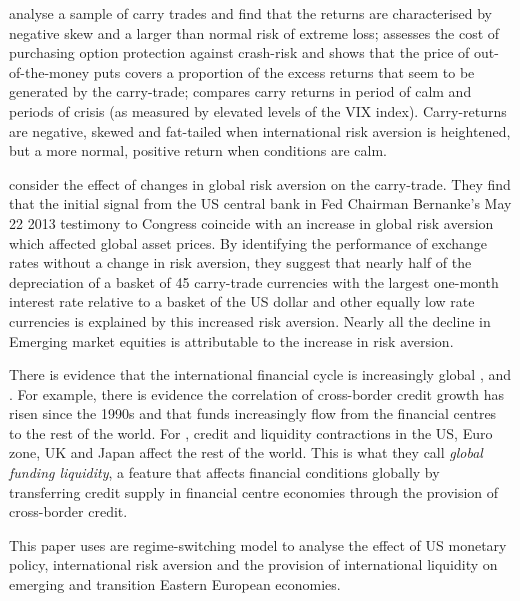 \documentclass[12pt, a4paper, oneside]{article} %
\begin{document}
\citet{BrunnermeierCarry} analyse a sample of carry trades and find that the returns are characterised by negative skew and a larger than normal risk of extreme loss; \citet{JurekCrash} assesses the cost of purchasing option protection against crash-risk and shows that the price of out-of-the-money puts covers a proportion of the excess returns that seem to be generated by the carry-trade; \citet{Hayward2013} compares carry returns in period of calm and periods of crisis (as measured by elevated levels of the VIX index).  Carry-returns are negative, skewed and fat-tailed when international risk aversion is heightened, but a more normal, positive return when conditions are calm. 

 
\citet{NYFedtaper} consider the effect of changes in global risk aversion on the carry-trade.  They find that the initial signal from the US central bank in Fed Chairman Bernanke's May 22 2013 testimony to Congress coincide with an increase in global risk aversion which affected global asset prices. %
By identifying the performance of exchange rates without a change in risk aversion, they suggest that nearly half of the depreciation of a basket of 45 carry-trade currencies with the largest one-month interest rate relative to a basket of the US dollar and other equally low rate currencies is explained by this increased risk aversion. Nearly all the decline in Emerging market equities is attributable to the increase in risk aversion.

There is evidence that the international financial cycle is increasingly global \citet{Rey2013}, \citet{Obstfeld2014} and \citet{Bruno2014}.  %
For example, there is evidence the correlation of cross-border credit growth has risen since the 1990s and that funds increasingly flow from the financial centres to the rest of the world. For \citet{Cerutti2014}, credit and liquidity contractions in  the US, Euro zone, UK and Japan affect the rest of the world.   This is what they call \emph{global funding liquidity}, a feature that affects financial conditions globally by transferring credit supply in financial centre economies through the provision of cross-border credit.

This paper uses are regime-switching model to analyse the effect of US monetary policy, international risk aversion and the provision of international liquidity on emerging and transition Eastern European economies.  
\end{document}
